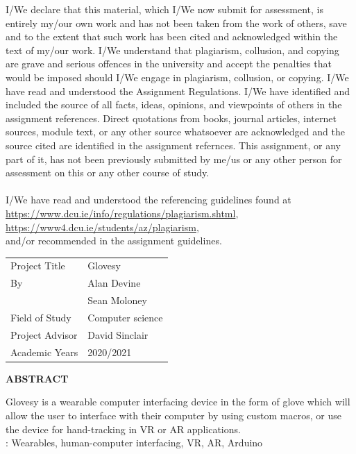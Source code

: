 \documentclass[12pt,a4paper,oneside]{book}
\theoremstyle{plain}
\numberwithin{equation}{chapter} \DeclareMathOperator{\Var}{Var}
\begin{document}
\newpage
{}
\noindent I/We declare that this material, which I/We now submit for assessment, is entirely my/our own work and has not been taken from the work of others, save and to the extent that such work has been cited and acknowledged within the text of my/our work. I/We understand that plagiarism, collusion, and copying are grave and serious offences in the university and accept the penalties that would be imposed should I/We engage in plagiarism, collusion, or copying. I/We have read and understood the Assignment Regulations. I/We have identified and included the source of all facts, ideas, opinions, and viewpoints of others in the assignment references. Direct quotations from books, journal articles, internet sources, module text, or any other source whatsoever are acknowledged and the source cited are identified in the assignment refernces. This assignment, or any part of it, has not been previously submitted by me/us or any other person for assessment on this or any other course of study. \\
\\
I/We have read and understood the referencing guidelines found at \\ 
\url{https://www.dcu.ie/info/regulations/plagiarism.shtml}, \\
\url{https://www4.dcu.ie/students/az/plagiarism}, \\
and/or recommended in the assignment guidelines.

\newpage
{}
\begin{table}[h]
	\begin{tabular}{ll}
		Project Title								   & Glovesy  \\
		By							   					  & Alan Devine \\
															& Sean Moloney \\
		Field of Study			  					 & Computer science \\
		Project Advisor								& David Sinclair \\
		Academic Years							  & 2020/2021 \\
	\end{tabular}
\end{table}
\begin{center}
  \large{\textbf{ABSTRACT}}\\
\end{center}
Glovesy is a wearable computer interfacing device in the form of glove which will allow the user to interface with their computer by using custom macros, or use the device for hand-tracking in VR or AR applications. \\
 : Wearables, human-computer interfacing, VR, AR, Arduino
\end{document}
